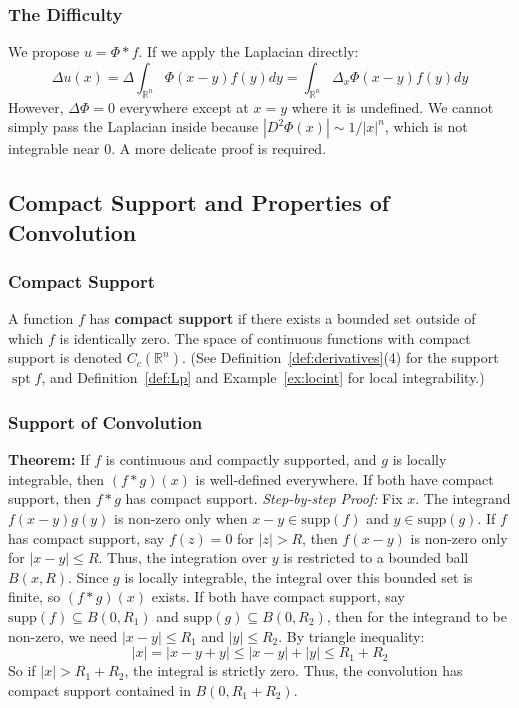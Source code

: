 \documentclass[11pt]{article}
\theoremstyle{plain}
\theoremstyle{definition}
\theoremstyle{remark}
\begin{document}
\subsubsection{The Difficulty}
We propose $u = \Phi * f$. If we apply the Laplacian directly:
$$ \Delta u(x) = \Delta \int_{\mathbb{R}^n} \Phi(x-y) f(y) dy = \int_{\mathbb{R}^n} \Delta_x \Phi(x-y) f(y) dy $$
However, $\Delta \Phi = 0$ everywhere except at $x=y$ where it is undefined. We cannot simply pass the Laplacian inside because $|D^2\Phi(x)| \sim 1/|x|^n$, which is not integrable near $0$. A more delicate proof is required.

\subsection{Compact Support and Properties of Convolution}
\subsubsection{Compact Support}
A function $f$ has \textbf{compact support} if there exists a bounded set outside of which $f$ is identically zero. The space of continuous functions with compact support is denoted $C_c(\mathbb{R}^n)$. (See Definition~\ref{def:derivatives}(4) for the support $\operatorname{spt} f$, and Definition~\ref{def:Lp} and Example~\ref{ex:locint} for local integrability.)

\subsubsection{Support of Convolution}
\textbf{Theorem:} If $f$ is continuous and compactly supported, and $g$ is locally integrable, then $(f*g)(x)$ is well-defined everywhere. If both have compact support, then $f*g$ has compact support.
\textit{Step-by-step Proof:}
Fix $x$. The integrand $f(x-y)g(y)$ is non-zero only when $x-y \in \text{supp}(f)$ and $y \in \text{supp}(g)$.
If $f$ has compact support, say $f(z)=0$ for $|z| > R$, then $f(x-y)$ is non-zero only for $|x-y| \leq R$. Thus, the integration over $y$ is restricted to a bounded ball $B(x, R)$. Since $g$ is locally integrable, the integral over this bounded set is finite, so $(f*g)(x)$ exists.
If both have compact support, say $\text{supp}(f) \subseteq B(0, R_1)$ and $\text{supp}(g) \subseteq B(0, R_2)$, then for the integrand to be non-zero, we need $|x-y| \leq R_1$ and $|y| \leq R_2$. By triangle inequality:
$$ |x| = |x - y + y| \leq |x-y| + |y| \leq R_1 + R_2 $$
So if $|x| > R_1 + R_2$, the integral is strictly zero. Thus, the convolution has compact support contained in $B(0, R_1+R_2)$.
\end{document}
